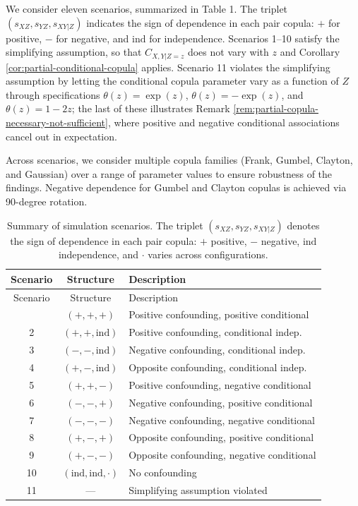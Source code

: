 \documentclass[
]{article}
\begin{document}
We consider eleven scenarios, summarized in Table 1. The triplet
\((s_{XZ}, s_{YZ}, s_{XY|Z})\) indicates the sign of dependence in each
pair copula: \(+\) for positive, \(-\) for negative, and \(\text{ind}\)
for independence. Scenarios 1--10 satisfy the simplifying assumption, so
that \(C_{X,Y|Z=z}\) does not vary with \(z\) and Corollary
\ref{cor:partial-conditional-copula} applies. Scenario 11 violates the
simplifying assumption by letting the conditional copula parameter vary
as a function of \(Z\) through specifications \(\theta(z) = \exp(z)\),
\(\theta(z) = -\exp(z)\), and \(\theta(z) = 1 - 2z\); the last of these
illustrates Remark \ref{rem:partial-copula-necessary-not-sufficient},
where positive and negative conditional associations cancel out in
expectation.

Across scenarios, we consider multiple copula families (Frank, Gumbel,
Clayton, and Gaussian) over a range of parameter values to ensure
robustness of the findings. Negative dependence for Gumbel and Clayton
copulas is achieved via 90-degree rotation.

\small

\begin{longtable}[]{@{}ccl@{}}
\caption{Summary of simulation scenarios. The triplet
\((s_{XZ}, s_{YZ}, s_{XY|Z})\) denotes the sign of dependence in each
pair copula: \(+\) positive, \(-\) negative, \(\text{ind}\)
independence, and \(\cdot\) varies across
configurations.}\tabularnewline
\toprule\noalign{}
Scenario & Structure & Description \\
\midrule\noalign{}
\endfirsthead
\toprule\noalign{}
Scenario & Structure & Description \\
\midrule\noalign{}
\endhead
\bottomrule\noalign{}
\endlastfoot
1 & \((+,+,+)\) & Positive confounding, positive conditional \\
2 & \((+,+,\text{ind})\) & Positive confounding, conditional indep. \\
3 & \((-,-,\text{ind})\) & Negative confounding, conditional indep. \\
4 & \((+,-,\text{ind})\) & Opposite confounding, conditional indep. \\
5 & \((+,+,-)\) & Positive confounding, negative conditional \\
6 & \((-,-,+)\) & Negative confounding, positive conditional \\
7 & \((-,-,-)\) & Negative confounding, negative conditional \\
8 & \((+,-,+)\) & Opposite confounding, positive conditional \\
9 & \((+,-,-)\) & Opposite confounding, negative conditional \\
10 & \((\text{ind},\text{ind},\cdot)\) & No confounding \\
11 & --- & Simplifying assumption violated \\
\end{longtable}
\end{document}
